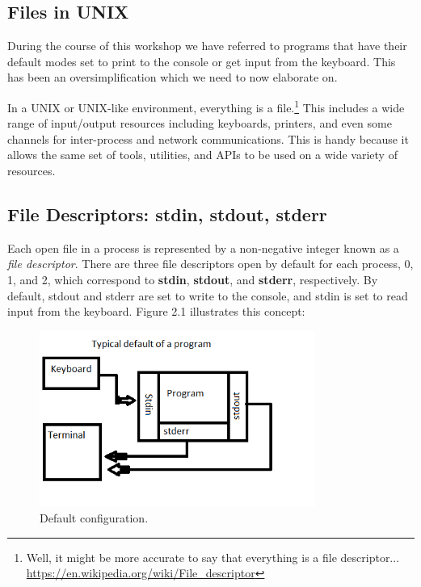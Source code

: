 \documentclass[oneside]{book}
\begin{document}
    \subsection{Files in UNIX}
    During the course of this workshop we have referred to programs that have their default modes set to print to the console or get input from the keyboard. This has been an oversimplification which we need to now elaborate on.
        
    In a UNIX or UNIX-like environment, everything is a file.\footnote{Well, it might be more accurate to say that everything is a file descriptor... \url{https://en.wikipedia.org/wiki/File_descriptor}} This includes a wide range of input/output resources including keyboards, printers, and even some channels for inter-process and network communications. This is handy because it allows the same set of tools, utilities, and APIs to be used on a wide variety of resources.
    
    \subsection{File Descriptors: stdin, stdout, stderr}
        Each open file in a process is represented by a non-negative integer known as a \textit{file descriptor}. There are three file descriptors open by default for each process, 0, 1, and 2, which correspond to \textbf{stdin}, \textbf{stdout}, and \textbf{stderr}, respectively. By default, stdout and stderr are set to write to the console, and stdin is set to read input from the keyboard. Figure 2.1 illustrates this concept:
        
        \begin{figure}[H]
        	\centering
        	\label{tab:directory_tree}
        	\includegraphics[width=90mm]{stdin_err_out_example.png}
        	\caption{Default configuration.}
        \end{figure}        
     
\end{document}
